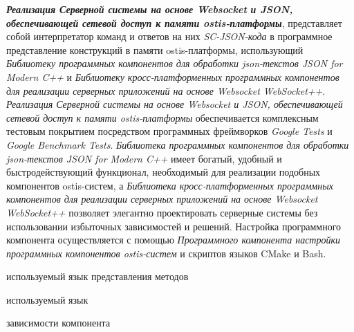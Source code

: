 \textbf{\textit{Реализация Серверной системы на основе Websocket и JSON, обеспечивающей сетевой доступ к памяти ostis-платформы}}, представляет собой интерпретатор команд и ответов на них \textit{SC-JSON-кода} в программное представление конструкций в памяти ostis-платформы, использующий \textit{Библиотеку программных компонентов для обработки json-текстов JSON for Modern C++} и \textit{Библиотеку кросс-платформенных программных компонентов для реализации серверных приложений на основе Websocket WebSocket++}. \textit{Реализация Серверной системы на основе Websocket и JSON, обеспечивающей сетевой доступ к памяти ostis-платформы} обеспечивается комплексным тестовым покрытием посредством программных фреймворков \textit{Google Tests} и \textit{Google Benchmark Tests}. \textit{Библиотека программных компонентов для обработки json-текстов JSON for Modern C++} имеет богатый, удобный и быстродействующий функционал, необходимый для реализации подобных компонентов ostis-систем, а \textit{Библиотека кросс-платформенных программных компонентов для реализации серверных приложений на основе Websocket WebSocket++} позволяет элегантно проектировать серверные системы без использовании избыточных зависимостей и решений. Настройка программного компонента осуществляется с помощью \textit{Программного компонента настройки программных компонентов ostis-систем} и скриптов языков CMake и Bash.

\begin{SCn}
\begin{scnrelfromlist}{используемый язык представления методов}
\end{scnrelfromlist}
\begin{scnrelfromlist}{используемый язык}
\end{scnrelfromlist}
\begin{scnrelfromset}{зависимости компонента}
\end{scnrelfromset}
\end{SCn}


